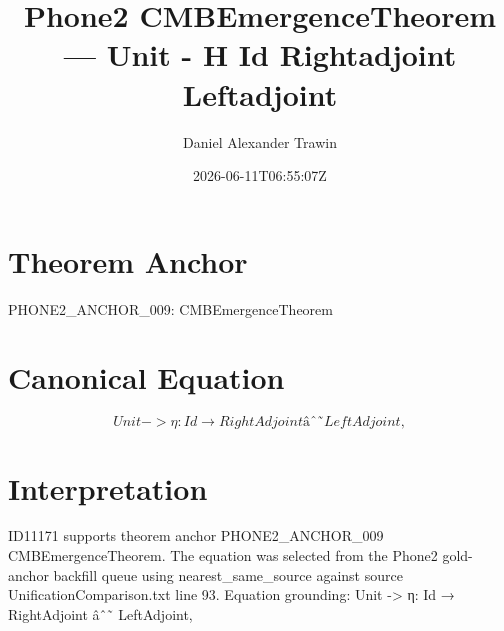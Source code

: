 \documentclass[11pt]{article}
\title{Phone2 CMBEmergenceTheorem — Unit - Η Id Rightadjoint Leftadjoint}
\author{Daniel Alexander Trawin}
\date{2026-06-11T06:55:07Z}
\begin{document}
\maketitle
\section*{Theorem Anchor}
PHONE2_ANCHOR_009: CMBEmergenceTheorem
\section*{Canonical Equation}
\[
Unit -> η: Id → RightAdjoint âˆ˜ LeftAdjoint,
\]
\section*{Interpretation}
ID11171 supports theorem anchor PHONE2_ANCHOR_009 CMBEmergenceTheorem. The equation was selected from the Phone2 gold-anchor backfill queue using nearest_same_source against source UnificationComparison.txt line 93. Equation grounding: Unit -> η: Id → RightAdjoint âˆ˜ LeftAdjoint,
\end{document}

